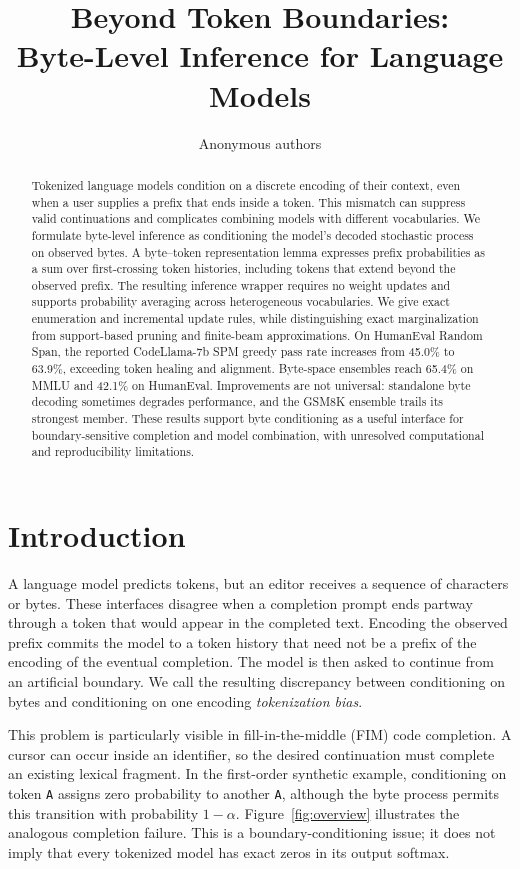 \documentclass{article}
\title{Beyond Token Boundaries:\\Byte-Level Inference for Language Models}
\author{Anonymous authors}
\begin{document}
\maketitle

\begin{abstract}
Tokenized language models condition on a discrete encoding of their context, even when a user supplies a prefix that ends inside a token. This mismatch can suppress valid continuations and complicates combining models with different vocabularies. We formulate byte-level inference as conditioning the model's decoded stochastic process on observed bytes. A byte--token representation lemma expresses prefix probabilities as a sum over first-crossing token histories, including tokens that extend beyond the observed prefix. The resulting inference wrapper requires no weight updates and supports probability averaging across heterogeneous vocabularies. We give exact enumeration and incremental update rules, while distinguishing exact marginalization from support-based pruning and finite-beam approximations. On HumanEval Random Span, the reported CodeLlama-7b SPM greedy pass rate increases from 45.0\% to 63.9\%, exceeding token healing and alignment. Byte-space ensembles reach 65.4\% on MMLU and 42.1\% on HumanEval. Improvements are not universal: standalone byte decoding sometimes degrades performance, and the GSM8K ensemble trails its strongest member. These results support byte conditioning as a useful interface for boundary-sensitive completion and model combination, with unresolved computational and reproducibility limitations.
\end{abstract}

\section{Introduction}
\label{sec:intro}
A language model predicts tokens, but an editor receives a sequence of characters or bytes. These interfaces disagree when a completion prompt ends partway through a token that would appear in the completed text. Encoding the observed prefix commits the model to a token history that need not be a prefix of the encoding of the eventual completion. The model is then asked to continue from an artificial boundary. We call the resulting discrepancy between conditioning on bytes and conditioning on one encoding \emph{tokenization bias}.

This problem is particularly visible in fill-in-the-middle (FIM) code completion. A cursor can occur inside an identifier, so the desired continuation must complete an existing lexical fragment. In the first-order synthetic example, conditioning on token \texttt{A} assigns zero probability to another \texttt{A}, although the byte process permits this transition with probability $1-\alpha$. Figure~\ref{fig:overview} illustrates the analogous completion failure. This is a boundary-conditioning issue; it does not imply that every tokenized model has exact zeros in its output softmax.
\end{document}
